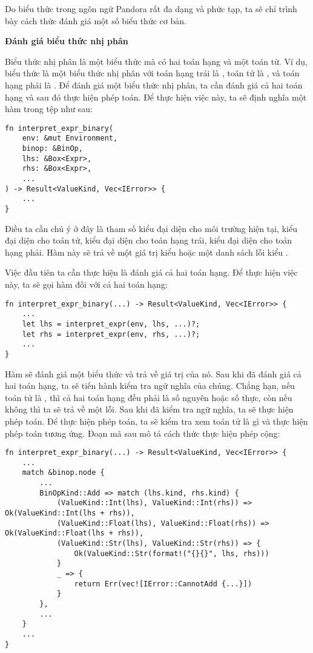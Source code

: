     Do biểu thức trong ngôn ngữ Pandora rất đa dạng và phức tạp, ta sẽ chỉ trình bày cách thức đánh giá một số biểu thức cơ bản. 

\noindent \textbf{Đánh giá biểu thức nhị phân}

    Biểu thức nhị phân là một biểu thức mà có hai toán hạng và một toán tử. Ví dụ, biểu thức  là một biểu thức nhị phân với toán hạng trái là , toán tử là \kw{+}, và toán hạng phải là . Để đánh giá một biểu thức nhị phân, ta cần đánh giá cả hai toán hạng và sau đó thực hiện phép toán. Để thực hiện việc này, ta sẽ định nghĩa một hàm  trong tệp  như sau:

\begin{lstlisting}[]
fn interpret_expr_binary(
    env: &mut Environment,
    binop: &BinOp,
    lhs: &Box<Expr>,
    rhs: &Box<Expr>,
    ...
) -> Result<ValueKind, Vec<IError>> {
    ...
}
\end{lstlisting}

    Điều ta cần chú ý ở đây là tham số  kiểu  đại diện cho môi trường hiện tại,  kiểu  đại diện cho toán tử,  kiểu  đại diện cho toán hạng trái,  kiểu  đại diện cho toán hạng phải. Hàm này sẽ trả về một giá trị kiểu  hoặc một danh sách lỗi kiểu .

    Việc đầu tiên ta cần thực hiện là đánh giá cả hai toán hạng. Để thực hiện việc này, ta sẽ gọi hàm  đối với cả hai toán hạng:

\begin{lstlisting}[]
fn interpret_expr_binary(...) -> Result<ValueKind, Vec<IError>> {
    ...
    let lhs = interpret_expr(env, lhs, ...)?;
    let rhs = interpret_expr(env, rhs, ...)?;
    ...
}
\end{lstlisting}

    Hàm  sẽ đánh giá một biểu thức và trả về giá trị của nó. Sau khi đã đánh giá cả hai toán hạng, ta sẽ tiến hành kiểm tra ngữ nghĩa của chúng. Chẳng hạn, nếu toán tử là \kw{+}, thì cả hai toán hạng đều phải là số nguyên hoặc số thực, còn nếu không thì ta sẽ trả về một lỗi. Sau khi đã kiểm tra ngữ nghĩa, ta sẽ thực hiện phép toán. Để thực hiện phép toán, ta sẽ kiểm tra xem toán tử là gì và thực hiện phép toán tương ứng. Đoạn mã sau mô tả cách thức thực hiện phép cộng:

\begin{lstlisting}[]
fn interpret_expr_binary(...) -> Result<ValueKind, Vec<IError>> {
    ...
    match &binop.node {
        ...
        BinOpKind::Add => match (lhs.kind, rhs.kind) {
            (ValueKind::Int(lhs), ValueKind::Int(rhs)) => Ok(ValueKind::Int(lhs + rhs)),
            (ValueKind::Float(lhs), ValueKind::Float(rhs)) => Ok(ValueKind::Float(lhs + rhs)),
            (ValueKind::Str(lhs), ValueKind::Str(rhs)) => {
                Ok(ValueKind::Str(format!("{}{}", lhs, rhs)))
            }
            _ => {
                return Err(vec![IError::CannotAdd {...}])
            }
        },
        ...
    }
    ...
}
\end{lstlisting}

